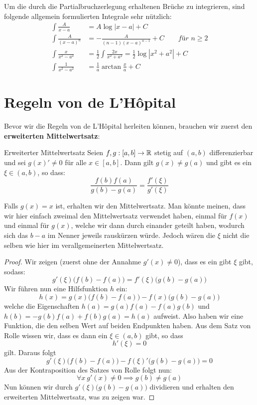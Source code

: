 \begin{tipp}{}{}
Um die durch die Partialbruchzerlegung erhaltenen Brüche zu integrieren, sind folgende allgemein formulierten Integrale sehr nützlich:
\begin{align*}
\int \frac{A}{x-a} &= A \log|x-a| + C\\
\int \frac{A}{(x-a)^n} &= -\frac{A}{(n-1)(x-a)^{n-1}} + C \qquad \textit{für }n\geq2\\
\int \frac{x}{x^2-a^2} &= \frac{1}{2} \int \frac{2x}{x^2+a^2} = \frac{1}{2} \log |x^2+a^2| + C\\
\int \frac{1}{x^2-a^2} &= \frac{1}{a} \arctan \frac{x}{a} + C
\end{align*}

\end{tipp}

\section{Regeln von de L'Hôpital}
Bevor wir die Regeln von de L'Hôpital herleiten können, brauchen wir zuerst den \textbf{erweiterten Mittelwertsatz}:
\begin{satz}{Erweiterter Mittelwertsatz}{}
Seien $f,g : [a,b] \to \mathbb{R}$ stetig auf $(a,b)$ differenzierbar und sei $g(x)' \ne 0$ für alle $x \in [a,b]$. Dann gilt $g(x) \ne g(a)$ und gibt es ein $\xi \in (a,b)$, so dass:
$$\frac{f(b)f(a)}{g(b)-g(a)} = \frac{f'(\xi)}{g'(\xi)}$$
\end{satz}
\begin{remark}
Falls $g(x)=x$ ist, erhalten wir den Mittelwertsatz. Man könnte meinen, dass wir hier einfach zweimal den Mittelwertsatz verwendet haben, einmal für $f(x)$ und einmal für $g(x)$, welche wir dann durch einander geteilt haben, wodurch sich das $b-a$ im Nenner jeweils rauskürzen würde. Jedoch wären die $\xi$ nicht die selben wie hier im verallgemeinerten Mittelwertsatz.
\end{remark}
\begin{proof}
Wir zeigen (zuerst ohne der Annahme $g'(x)\ne0$), dass es ein gibt $\xi$ gibt, sodass:
$$g'(\xi)\Big(f(b)-f(a)\Big) = f'(\xi)\Big(g(b)-g(a)\Big)$$
Wir führen nun eine Hilfsfunktion $h$ ein:
$$h(x) = g(x)\Big(f(b)-f(a)\Big)-f(x)\Big(g(b)-g(a)\Big)$$
welche die Eigenschaften $h(a)=g(a)f(a)-f(a)g(b)$ und $h(b)=-g(b)f(a)+f(b)g(a) = h(a)$ aufweist.
Also haben wir eine Funktion, die den selben Wert auf beiden Endpunkten haben. Aus dem Satz von Rolle wissen wir, dass es dann ein $\xi \in (a,b)$ gibt, so dass
$$h'(\xi)=0$$
gilt. Daraus folgt 
$$g'(\xi)\Big(f(b)-f(a)\Big)-f(\xi)'\Big(g(b)-g(a)\Big) = 0$$
Aus der Kontraposition des Satzes von Rolle folgt nun:
$$ \forall x \ g'(x)\ne 0 \implies g(b) \ne g(a)$$
Nun können wir durch $g'(\xi)\big(g(b)-g(a)\big)$ dividieren und erhalten den erweiterten Mittelwertsatz, was zu zeigen war.
\end{proof}

